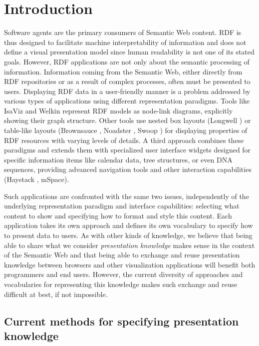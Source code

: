 \section{Introduction}

Software agents are the primary consumers of Semantic Web content. RDF is thus designed to facilitate machine interpretability of information and does not define a visual presentation model since human readability is not one of its stated goals. However, RDF applications are not only about the semantic processing of information. Information coming from the Semantic Web, either directly from RDF repositories or as a result of complex processes, often must be presented to users. Displaying RDF data in a user-friendly manner is a problem addressed by various types of applications using different representation paradigms. Tools like IsaViz \cite{isaviz} and Welkin \cite{Welkin} represent RDF models as node-link diagrams, explicitly showing their graph structure. Other tools use nested box layouts (Longwell \cite{simile}) or table-like layouts (Brownsauce \cite{Steer03}, Noadster \cite{Rutledge05}, Swoop \cite{MindSwap05}) for displaying properties of RDF resources with varying levels of details. A third approach combines these paradigms and extends them with specialized user interface widgets designed for specific information items like calendar data, tree structures, or even DNA sequences, providing advanced navigation tools and other interaction capabilities (Haystack \cite{Quan04}, mSpace\cite{mspace2005}).

Such applications are confronted with the same two issues, independently of the underlying representation paradigm and interface capabilities: selecting what content to show and specifying how to format and style this content. Each application takes its own approach and defines its own vocabulary to specify how to present data to users. As with other kinds of knowledge, we believe that being able to share what we consider {\em presentation knowledge} makes sense in the context of the Semantic Web and that being able to exchange and reuse presentation knowledge between browsers and other visualization applications will benefit both programmers and end users. However, the current diversity of approaches and vocabularies for representing this knowledge makes such exchange and reuse difficult at best, if not impossible.

\subsection{Current methods for specifying presentation knowledge}

